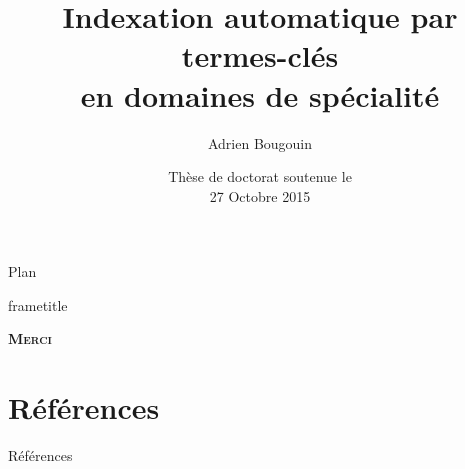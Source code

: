 \documentclass[10pt, xcolor={usenames, dvipsnames}]{beamer}
\title{Indexation automatique par termes-clés\\en domaines de spécialité}
\author{Adrien Bougouin}
\institute{\normalsize{Université de Nantes, LINA}}
\date{Thèse de doctorat soutenue le\\27 Octobre 2015}
\begin{document}

  \begin{frame}
    \titlepage
  \end{frame}

  
  \begin{frame}{Plan}
    \tableofcontents
    \cite{bougouin2013topicrank}
  \end{frame}
  \begin{frame}
    \vfill
    \begin{beamercolorbox}[center,shadow=false,rounded=false]{frametitle} 
      \vspace{.15em}\par
      \Huge{\textbf{\textsc{Merci}}}
      \vspace{.5em}
    \end{beamercolorbox}
    \vfill
  \end{frame}
  \section*{Références}
    \begin{frame}[allowframebreaks]{Références}
      \def\newblock{\hskip .11em plus .33em minus .07em}
      
      
    \end{frame}
\end{document}

